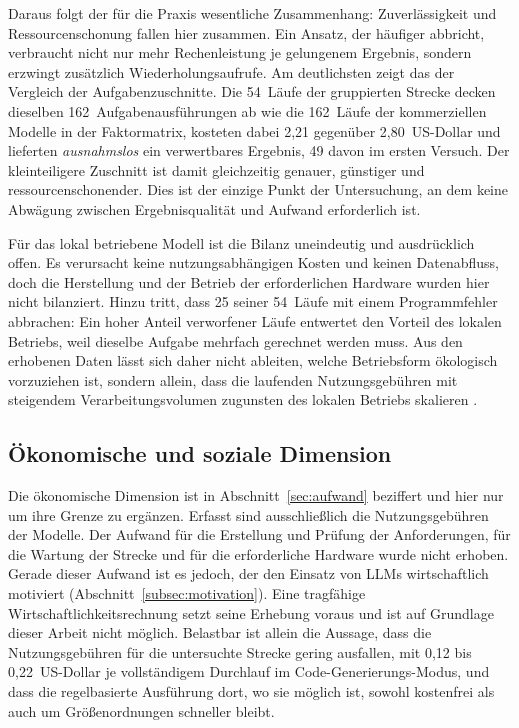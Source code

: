 Daraus folgt der für die Praxis wesentliche Zusammenhang: Zuverlässigkeit und Ressourcenschonung fallen hier zusammen. Ein Ansatz, der häufiger abbricht, verbraucht nicht nur mehr Rechenleistung je gelungenem Ergebnis, sondern erzwingt zusätzlich Wiederholungsaufrufe. Am deutlichsten zeigt das der Vergleich der Aufgabenzuschnitte. Die 54~Läufe der gruppierten Strecke decken dieselben 162~Aufgabenausführungen ab wie die 162~Läufe der kommerziellen Modelle in der Faktormatrix, kosteten dabei 2,21 gegenüber 2,80~US-Dollar und lieferten \emph{ausnahmslos} ein verwertbares Ergebnis, 49 davon im ersten Versuch. Der kleinteiligere Zuschnitt ist damit gleichzeitig genauer, günstiger und ressourcenschonender. Dies ist der einzige Punkt der Untersuchung, an dem keine Abwägung zwischen Ergebnisqualität und Aufwand erforderlich ist.

Für das lokal betriebene Modell ist die Bilanz uneindeutig und ausdrücklich offen. Es verursacht keine nutzungsabhängigen Kosten und keinen Datenabfluss, doch die Herstellung und der Betrieb der erforderlichen Hardware wurden hier nicht bilanziert. Hinzu tritt, dass 25 seiner 54~Läufe mit einem Programmfehler abbrachen: Ein hoher Anteil verworfener Läufe entwertet den Vorteil des lokalen Betriebs, weil dieselbe Aufgabe mehrfach gerechnet werden muss. Aus den erhobenen Daten lässt sich daher nicht ableiten, welche Betriebsform ökologisch vorzuziehen ist, sondern allein, dass die laufenden Nutzungsgebühren mit steigendem Verarbeitungsvolumen zugunsten des lokalen Betriebs skalieren \autocite{zhaoSurveyLargeLanguage2026,2026AIIndex}.

\subsection{Ökonomische und soziale Dimension}
\label{subsec:nachhaltigkeit-oekonomisch-sozial}

Die ökonomische Dimension ist in Abschnitt~\ref{sec:aufwand} beziffert und hier nur um ihre Grenze zu ergänzen. Erfasst sind ausschließlich die Nutzungsgebühren der Modelle. Der Aufwand für die Erstellung und Prüfung der Anforderungen, für die Wartung der Strecke und für die erforderliche Hardware wurde nicht erhoben. Gerade dieser Aufwand ist es jedoch, der den Einsatz von \acp{LLM} wirtschaftlich motiviert (Abschnitt~\ref{subsec:motivation}). Eine tragfähige Wirtschaftlichkeitsrechnung setzt seine Erhebung voraus und ist auf Grundlage dieser Arbeit nicht möglich. Belastbar ist allein die Aussage, dass die Nutzungsgebühren für die untersuchte Strecke gering ausfallen, mit 0,12 bis 0,22~US-Dollar je vollständigem Durchlauf im Code-Generierungs-Modus, und dass die regelbasierte Ausführung dort, wo sie möglich ist, sowohl kostenfrei als auch um Größenordnungen schneller bleibt.

